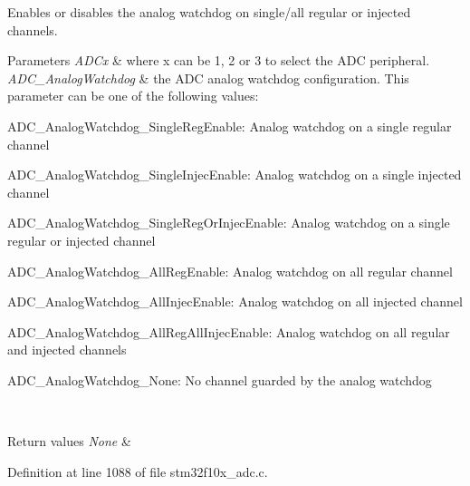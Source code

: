 Enables or disables the analog watchdog on single/all regular or injected channels. 


\begin{DoxyParams}{Parameters}
{\em A\+D\+Cx} & where x can be 1, 2 or 3 to select the A\+DC peripheral. \\
\hline
{\em A\+D\+C\+\_\+\+Analog\+Watchdog} & the A\+DC analog watchdog configuration. This parameter can be one of the following values\+: \begin{DoxyItemize}
\item A\+D\+C\+\_\+\+Analog\+Watchdog\+\_\+\+Single\+Reg\+Enable\+: Analog watchdog on a single regular channel \item A\+D\+C\+\_\+\+Analog\+Watchdog\+\_\+\+Single\+Injec\+Enable\+: Analog watchdog on a single injected channel \item A\+D\+C\+\_\+\+Analog\+Watchdog\+\_\+\+Single\+Reg\+Or\+Injec\+Enable\+: Analog watchdog on a single regular or injected channel \item A\+D\+C\+\_\+\+Analog\+Watchdog\+\_\+\+All\+Reg\+Enable\+: Analog watchdog on all regular channel \item A\+D\+C\+\_\+\+Analog\+Watchdog\+\_\+\+All\+Injec\+Enable\+: Analog watchdog on all injected channel \item A\+D\+C\+\_\+\+Analog\+Watchdog\+\_\+\+All\+Reg\+All\+Injec\+Enable\+: Analog watchdog on all regular and injected channels \item A\+D\+C\+\_\+\+Analog\+Watchdog\+\_\+\+None\+: No channel guarded by the analog watchdog \end{DoxyItemize}
\\
\hline
\end{DoxyParams}

\begin{DoxyRetVals}{Return values}
{\em None} & \\
\hline
\end{DoxyRetVals}


Definition at line 1088 of file stm32f10x\+\_\+adc.\+c.

\mbox{\label{group___a_d_c___exported___functions_ga03cef3d12292ffa2b8520524d5b0226c}} 
